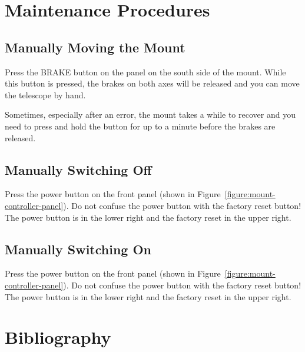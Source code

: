 \section{Maintenance Procedures}

\subsection{Manually Moving the Mount}

Press the BRAKE button on the panel on the south side of the mount. While this button is pressed, the brakes on both axes will be released and you can move the telescope by hand. 

Sometimes, especially after an error, the mount takes a while to recover and you need to press and hold the button for up to a minute before the brakes are released.

\subsection{Manually Switching Off}
\label{section:mount-power-off}

Press the power button on the front panel (shown in Figure~\ref{figure:mount-controller-panel}). Do not confuse the power button with the factory reset button! The power button is in the lower right and the factory reset in the upper right.

\subsection{Manually Switching On}
\label{section:mount-power-on}

Press the power button on the front panel (shown in Figure~\ref{figure:mount-controller-panel}). Do not confuse the power button with the factory reset button! The power button is in the lower right and the factory reset in the upper right.


\section{Bibliography}

